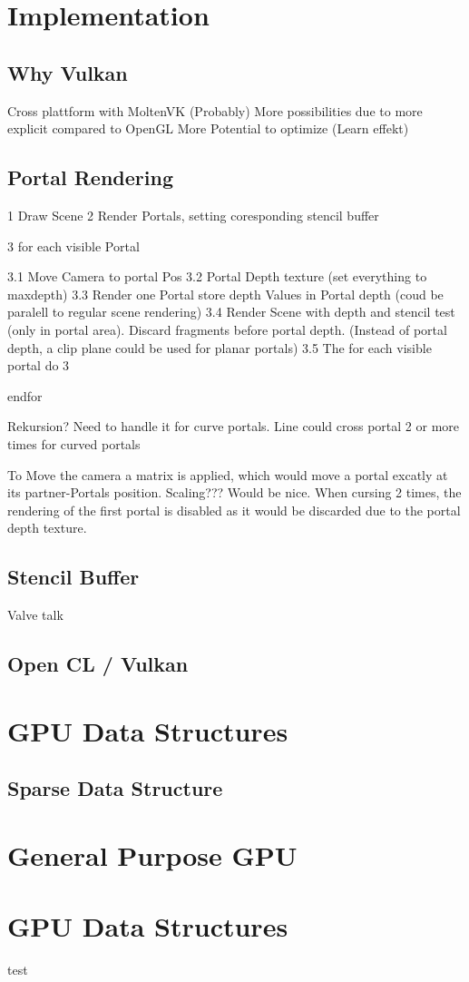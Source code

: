 \section{Implementation}
\subsection{Why Vulkan}
Cross plattform with MoltenVK
(Probably) More possibilities due to more explicit compared to OpenGL
More Potential to optimize
(Learn effekt)

\subsection{Portal Rendering}
1 Draw Scene
2 Render Portals, setting coresponding stencil buffer

3 for each visible Portal

3.1 Move Camera to portal Pos
3.2 Portal Depth texture (set everything to maxdepth)
3.3 Render one Portal store depth Values in Portal depth (coud be paralell to regular scene rendering)
3.4 Render Scene with depth and stencil test (only in portal area). Discard fragments before portal depth.
(Instead of portal depth, a clip plane could be used for planar portals)
3.5 The for each visible portal do 3

endfor

Rekursion? Need to handle it for curve portals. Line could cross portal 2 or more times for curved portals


To Move the camera a matrix is applied, which would move a portal excatly at its partner-Portals position. Scaling??? Would be nice.
When cursing 2 times, the rendering of the first portal is disabled as it would be discarded due to the portal depth texture.

\subsection{Stencil Buffer}
Valve talk

\subsection{Open CL / Vulkan}
\section{GPU Data Structures}
\subsection{Sparse Data Structure}

\section{General Purpose GPU}

\section{GPU Data Structures}

test \cite{Heuser:2003}